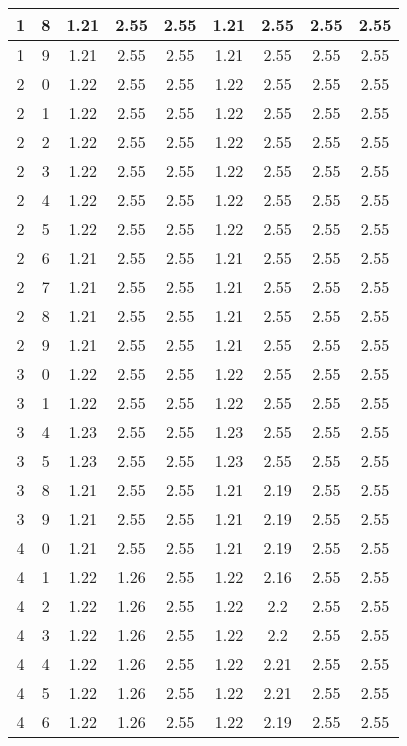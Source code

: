 \begin{longtable}{|c|c||c||c|c||c|c|c|c|}
	1 & 8 & 1.21 & 2.55 & 2.55 & 1.21 & 2.55 & 2.55 & 2.55 \\ \hline
	1 & 9 & 1.21 & 2.55 & 2.55 & 1.21 & 2.55 & 2.55 & 2.55 \\ \hline
	2 & 0 & 1.22 & 2.55 & 2.55 & 1.22 & 2.55 & 2.55 & 2.55 \\ \hline
	2 & 1 & 1.22 & 2.55 & 2.55 & 1.22 & 2.55 & 2.55 & 2.55 \\ \hline
	2 & 2 & 1.22 & 2.55 & 2.55 & 1.22 & 2.55 & 2.55 & 2.55 \\ \hline
	2 & 3 & 1.22 & 2.55 & 2.55 & 1.22 & 2.55 & 2.55 & 2.55 \\ \hline
	2 & 4 & 1.22 & 2.55 & 2.55 & 1.22 & 2.55 & 2.55 & 2.55 \\ \hline
	2 & 5 & 1.22 & 2.55 & 2.55 & 1.22 & 2.55 & 2.55 & 2.55 \\ \hline
	2 & 6 & 1.21 & 2.55 & 2.55 & 1.21 & 2.55 & 2.55 & 2.55 \\ \hline
	2 & 7 & 1.21 & 2.55 & 2.55 & 1.21 & 2.55 & 2.55 & 2.55 \\ \hline
	2 & 8 & 1.21 & 2.55 & 2.55 & 1.21 & 2.55 & 2.55 & 2.55 \\ \hline
	2 & 9 & 1.21 & 2.55 & 2.55 & 1.21 & 2.55 & 2.55 & 2.55 \\ \hline
	3 & 0 & 1.22 & 2.55 & 2.55 & 1.22 & 2.55 & 2.55 & 2.55 \\ \hline
	3 & 1 & 1.22 & 2.55 & 2.55 & 1.22 & 2.55 & 2.55 & 2.55 \\ \hline
	3 & 4 & 1.23 & 2.55 & 2.55 & 1.23 & 2.55 & 2.55 & 2.55 \\ \hline
	3 & 5 & 1.23 & 2.55 & 2.55 & 1.23 & 2.55 & 2.55 & 2.55 \\ \hline
	3 & 8 & 1.21 & 2.55 & 2.55 & 1.21 & 2.19 & 2.55 & 2.55 \\ \hline
	3 & 9 & 1.21 & 2.55 & 2.55 & 1.21 & 2.19 & 2.55 & 2.55 \\ \hline
	4 & 0 & 1.21 & 2.55 & 2.55 & 1.21 & 2.19 & 2.55 & 2.55 \\ \hline
	4 & 1 & 1.22 & 1.26 & 2.55 & 1.22 & 2.16 & 2.55 & 2.55 \\ \hline
	4 & 2 & 1.22 & 1.26 & 2.55 & 1.22 & 2.2 & 2.55 & 2.55 \\ \hline
	4 & 3 & 1.22 & 1.26 & 2.55 & 1.22 & 2.2 & 2.55 & 2.55 \\ \hline
	4 & 4 & 1.22 & 1.26 & 2.55 & 1.22 & 2.21 & 2.55 & 2.55 \\ \hline
	4 & 5 & 1.22 & 1.26 & 2.55 & 1.22 & 2.21 & 2.55 & 2.55 \\ \hline
	4 & 6 & 1.22 & 1.26 & 2.55 & 1.22 & 2.19 & 2.55 & 2.55 \\ \hline

\end{longtable}

